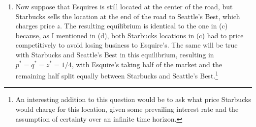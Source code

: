 \documentclass{article}
\begin{document}
\begin{enumerate}
\begin{enumerate}
            \item Now suppose that Esquires is still located at the center of the road, but Starbucks sells the location at the end of the road to Seattle's Best, which charges price $z$. The resulting equilibrium is identical to the one in (c) because, as I mentioned in (d), both Starbucks locations in (c) had to price competitively to avoid losing business to Esquire's. The same will be true with Starbucks and Seattle's Best in this equilibrium, resulting in ${p^*=q^*=z^*=1/4}$, with Esquire's taking half of the market and the remaining half split equally between Starbucks and Seattle's Best.\footnote{An interesting addition to this question would be to ask what price Starbucks would charge for this location, given some prevailing interest rate and the assumption of certainty over an infinite time horizon.}
              
          \end{enumerate}
\end{enumerate}

\end{document}
